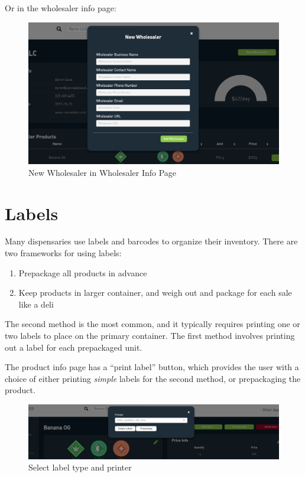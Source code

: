 \documentclass[]{book}
\theoremstyle{definition}
\theoremstyle{definition}
\theoremstyle{definition}
\theoremstyle{remark}
\begin{document}
Or in the wholesaler info page:

\begin{figure}
\centering
\includegraphics{images/newWholesaler2.png}
\caption{New Wholesaler in Wholesaler Info Page}
\end{figure}

\section{Labels}\label{labels}

Many dispensaries use labels and barcodes to organize their inventory.
There are two frameworks for using labels:

\begin{enumerate}
\def\labelenumi{\arabic{enumi}.}
\item
  Prepackage all products in advance
\item
  Keep products in larger container, and weigh out and package for each
  sale like a deli
\end{enumerate}

The second method is the most common, and it typically requires printing
one or two labels to place on the primary container. The first method
involves printing out a label for each prepackaged unit.

The product info page has a ``print label'' button, which provides the
user with a choice of either printing \emph{simple} labels for the
second method, or prepackaging the product.

\begin{figure}
\centering
\includegraphics{images/label1.png}
\caption{Select label type and printer}
\end{figure}
\end{document}
